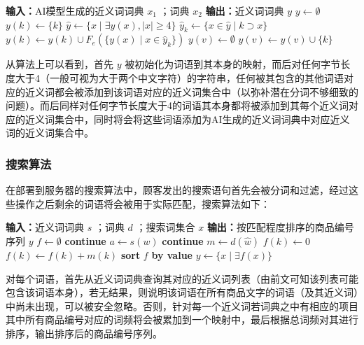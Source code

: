 \vspace{1em}
\begin{algorithmic}
	\STATE \textbf{输入：}AI模型生成的近义词词典 $x_1$ ；词典 $x_2$
	\STATE \textbf{输出：}近义词词典 $y$
	\STATE $y \gets \emptyset$
		\STATE $y(k) \gets \{k\}$
	\ENDFOR
	\STATE $\hat{y} \gets \{x \mid \exists y(x), \lvert x \rvert \geq 4 \}$
		\STATE $\hat{y}_k \gets \{x \in \hat{y} \mid k \supset x \}$
		\STATE $y(k) \gets y(k) \cup F_e(\{y(x) \mid x \in \hat{y}_k\})$
	\ENDFOR
				\STATE $y(v) \gets \emptyset$
			\ENDIF
			\STATE $y(v) \gets y(v) \cup \{k\}$
		\ENDFOR
	\ENDFOR
\end{algorithmic}
\vspace{1em}

从算法上可以看到，首先 $y$ 被初始化为词语到其本身的映射，而后对任何字节长度大于4（一般可视为大于两个中文字符）的字符串，任何被其包含的其他词语对应的近义词都会被添加到该词语对应的近义词集合中（以弥补潜在分词不够细致的问题）。而后同样对任何字节长度大于4的词语其本身都将被添加到其每个近义词对应的近义词集合中，同时将会将这些词语添加为AI生成的近义词词典中对应近义词的近义词集合中。

\subsubsection{搜索算法}

在部署到服务器的搜索算法中，顾客发出的搜索语句首先会被分词和过滤，经过这些操作之后剩余的词语将会被用于实际匹配，搜索算法如下：

\vspace{1em}
\begin{algorithmic}
	\STATE \textbf{输入：}近义词词典 $s$ ；词典 $d$ ；搜索词集合 $x$
	\STATE \textbf{输出：}按匹配程度排序的商品编号序列 $y$
	\STATE $f \gets \emptyset$
			\STATE \textbf{continue}
		\ENDIF
		\STATE $a \gets s(w)$
				\STATE \textbf{continue}
			\ENDIF
			\STATE $m \gets d(\hat{w})$
					\STATE $f(k) \gets 0$
				\ENDIF
				\STATE $f(k) \gets f(k) + m(k)$
			\ENDFOR
		\ENDFOR
	\ENDFOR
	\STATE \textbf{sort} $f$ \textbf{by value} 
	\STATE $y \gets \{x \mid \exists f(x)\}$
\end{algorithmic}
\vspace{1em}

对每个词语，首先从近义词词典查询其对应的近义词列表（由前文可知该列表可能包含该词语本身），若无结果，则说明该词语在所有商品文字的词语（及其近义词）中尚未出现，可以被安全忽略。否则，针对每一个近义词若词典之中有相应的项目其中所有商品编号对应的词频将会被累加到一个映射中，最后根据总词频对其进行排序，输出排序后的商品编号序列。